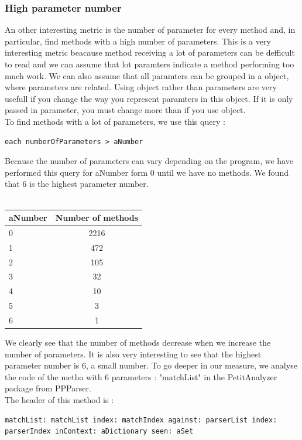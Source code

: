 \subsubsection{High parameter number}
An other interesting metric is the number of parameter for every method and, in particular, find methods with a high number of parameters.  This is a very interesting metric beacause method receiving a lot of parameters can be defficult to read and we can assume that lot paramters indicate a method performing too much work.  We can also assume that all paramters can be grouped in a object, where parameters are related.  Using object rather than parameters are very usefull if you change the way you represent paramters in this object.  If it is only passed in parameter, you must change more than if you use object.\\
To find methods with a lot of parameters, we use this query :

\begin{lstlisting}
each numberOfParameters > aNumber
\end{lstlisting}
Because the number of parameters can vary depending on the program, we have performed this query for aNumber form 0 until we have no methods.  We found that 6 is the highest parameter number. \\ \\

\begin{tabular}{|l|c|}
  \hline
  aNumber& Number of methods \\
  \hline
  0 & 2216 \\
  1 & 472 \\
  2 & 105 \\
  3 & 32 \\
  4 & 10 \\
  5 & 3 \\
  6 & 1 \\
  \hline
\end{tabular}
We clearly see that the number of methods decrease when we increase the number of parameters.  It is also very interesting to see that the highest parameter number is 6, a small number.  To go deeper in our measure, we analyse the code of the metho with 6 parameters :  "matchList" in the PetitAnalyzer package from PPParser.\\
The header of this method is :
\begin{lstlisting}
matchList: matchList index: matchIndex against: parserList index: parserIndex inContext: aDictionary seen: aSet
\end{lstlisting}

